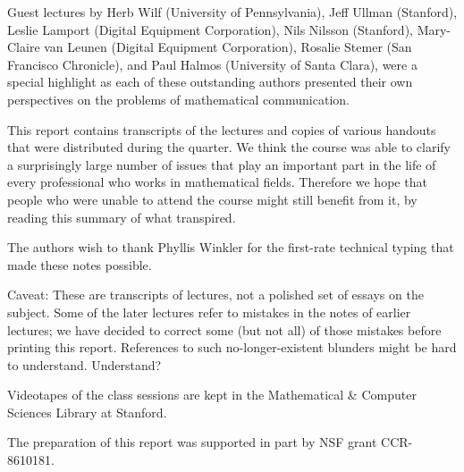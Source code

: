 Guest lectures by Herb Wilf (University of Pennsylvania),
Jeff Ullman (Stanford), Leslie Lamport (Digital Equipment Corporation),
Nils Nilsson (Stanford), Mary-Claire van Leunen (Digital Equipment
Corporation), Rosalie Stemer (San Francisco Chronicle), and
Paul Halmos (University of Santa Clara), were a special highlight
as each of these outstanding authors presented their own perspectives
on the problems of mathematical communication.

This report contains transcripts of the lectures and copies of
various handouts that were distributed during the quarter. We think the
course was able to clarify a surprisingly large number of
issues that play an important part in the life of every
professional who works in mathematical fields. Therefore we hope
that people who were unable to attend the course might still
benefit from it, by reading this summary of what transpired.

The authors wish to thank Phyllis Winkler for the first-rate technical
typing that made these notes possible.

Caveat: These are transcripts of lectures, not a polished set of
essays on the subject. Some of the later lectures refer to mistakes
in the notes of earlier lectures; we have decided to correct some
(but not all)
of those mistakes before printing this report. References to such
no-longer-existent blunders might be hard to understand. Understand?

Videotapes of the class sessions are kept in the Mathematical \& Computer
Sciences Library at Stanford.

The preparation of this report was supported in part by NSF grant CCR-8610181.

\eject


